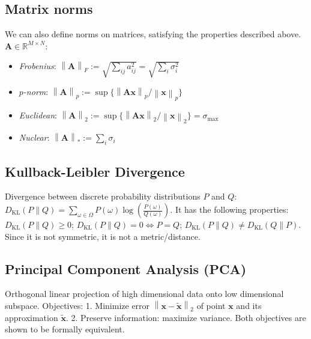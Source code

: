 \documentclass[11pt,a4paper,technote]{IEEEtran}
\newcommand{\norm}[1]{\left\lVert#1\right\rVert}
\newcommand{\matr}[1]{\boldsymbol{\mathbf{#1}}}
\newcommand{\vect}[1]{\boldsymbol{\mathbf{#1}}}
\newcommand{\R}{\mathbb{R}}
\begin{document}
\vspace{-1em}
\subsection*{Matrix norms}
We can also define norms on matrices, satisfying the properties described
above. $\matr{A} \in \R^{M \times N}$:
\begin{itemize}
  \item \emph{Frobenius}:
    \(
      \norm{\matr{A}}_F := \sqrt{\sum_{ij} a_{ij}^2}
      = \sqrt{\sum_i \sigma_i^2}
    \)

  \item \emph{$p$-norm}:
    \(
      \norm{\matr{A}}_p := \sup\{\norm{\matr{A}\vect{x}}_p/\norm{\vect{x}}_p\}
    \)
  \item \emph{Euclidean}:
    \(
      \norm{\matr{A}}_2 := \sup\{\norm{\matr{A}\vect{x}}_2/\norm{\vect{x}}_2\}
      = \sigma_{\max}
    \)
  \item \emph{Nuclear}:
    \(
      \norm{\matr{A}}_{*} := \sum_{i} \sigma_i
    \)

\end{itemize}

\vspace{-1em}
\subsection*{Kullback-Leibler Divergence}
  Divergence between discrete probability distributions $P$ and $Q$:
  \(
    D_{\mathrm{KL}}(P \| Q) = \sum_{\omega \in \Omega} P(\omega)
    \log\left(\frac{P(\omega)}{Q(\omega)}\right)
  \). It has the following properties:
  $D_{\mathrm{KL}}(P \| Q) \geq 0$;
  $D_{\mathrm{KL}}(P \| Q) = 0 \iff P = Q$;
  $D_{\mathrm{KL}}(P \| Q) \neq D_{\mathrm{KL}}(Q \| P)$.
  Since it is not symmetric, it is not a metric/distance.

\vspace{-1em}
\subsection*{Principal Component Analysis (PCA)}
Orthogonal linear projection of high dimensional data onto low dimensional
subspace. Objectives:
1. Minimize error $\norm{\vect{x} - \tilde{\vect{x}}}_2$ of point $\vect{x}$
and its approximation $\tilde{\vect{x}}$.
2. Preserve information: maximize variance.
Both objectives are shown to be formally equivalent.
\end{document}
